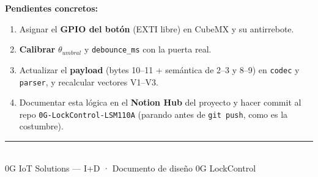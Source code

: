 \documentclass[11pt,a4paper]{article}
\begin{document}
\textbf{Pendientes concretos:}
\begin{enumerate}[leftmargin=1.6em,itemsep=0.25em]
  \item Asignar el \textbf{GPIO del botón} (EXTI libre) en CubeMX y su antirrebote.
  \item \textbf{Calibrar} $\theta_{umbral}$ y \texttt{debounce\_ms} con la puerta real.
  \item Actualizar el \textbf{payload} (bytes 10--11 + semántica de 2--3 y 8--9) en
  \texttt{codec} y \texttt{parser}, y recalcular vectores V1--V3.
  \item Documentar esta lógica en el \textbf{Notion Hub} del proyecto y hacer
  commit al repo \texttt{0G-LockControl-\allowbreak LSM110A} (parando antes de \texttt{git push},
  como es la costumbre).
\end{enumerate}

\vfill
\begin{center}
{\color{Mid0G}\rule{0.5\linewidth}{1pt}}\\[0.3em]
{\small\color{Gray0G} 0G IoT Solutions — I+D · Documento de diseño 0G LockControl}
\end{center}
\end{document}
